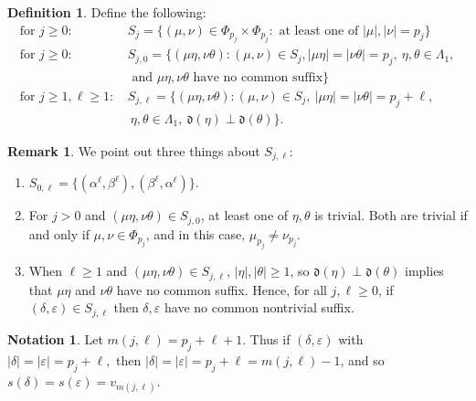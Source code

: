 \documentclass[12pt]{amsart}
\newcommand{\mf}[1]{\mathfrak{#1}}
\newcommand{\al}{\alpha}
\newcommand{\be}{\beta}
\newcommand{\de}{\delta}
\newcommand{\ep}{\varepsilon}
\renewcommand{\th}{\theta}
\newcommand{\La}{\Lambda}
\theoremstyle{plain} %
\theoremstyle{definition} %
\newtheorem{Definition}[Theorem]{Definition}
\newtheorem{Remark}[Theorem]{Remark}
\newtheorem{Notation}[Theorem]{Notation}
\begin{document}
\begin{Definition} Define the following:
\begin{align*}
    \text{for  $j\geq 0$: }& S_j = \{(\mu, \nu) \in \Phi_{p_j} \times \Phi_{p_j} : \text{ at least one of } |\mu|, |\nu| = p_j \}\\
    \text{for  $j\geq 0:$ }& S_{j,0} = \{(\mu\eta, \nu\th) : (\mu, \nu) \in S_j, |\mu\eta| =|\nu\th| = p_j,\ \eta, \th \in \La_1,\\ & \text{ and } \mu\eta, \nu\theta \text{ have no common suffix} \} \\
    \text{for  $j\geq 1,\ell \geq 1$: }& S_{j,\ell} = \{(\mu\eta, \nu\th) : (\mu, \nu) \in S_j,\ |\mu\eta| = |\nu\th| = p_j + \ell,\\
    &\ \eta, \th \in \La_1,\ \mf{d}(\eta)\perp \mf{d}(\th)\}.
\end{align*}
\end{Definition}


\begin{Remark}\label{remark S_jl}
We point out three things about $S_{j,\ell}$: \begin{enumerate}[(1)]
    \item\label{remark S_jl 1} $S_{0, \ell} = \{(\al^{\ell}, \be^{\ell}), (\be^{\ell}, \al^{\ell})\}$.

    \item\label{remark S_jl 2} For $j > 0$ and $(\mu \eta, \nu \th) \in S_{j,0}$, at least one of $\eta, \th$ is trivial. Both are trivial if and only if $\mu, \nu \in \Phi_{p_j}$, and in this case, $\mu_{p_j} \neq \nu_{p_j}$.
    
    \item\label{remark S_jl 3} When $\ell \ge 1$ and $(\mu\eta, \nu\th) \in S_{j,\ell}$, $|\eta|, |\th| \ge 1$, so $\mf{d}(\eta) \perp \mf{d}(\th)$ implies that $\mu\eta$ and $\nu\th$ have no common suffix. Hence, for all $j, \ell \ge 0$, if $(\de, \ep) \in S_{j,\ell}$ then $\de, \ep$ have no common nontrivial suffix.
\end{enumerate}
\end{Remark}

\begin{Notation}
    Let $m(j,\ell) = p_j + \ell + 1$. Thus if $(\delta, \ep) $ with $|\de| = |\ep| = p_j + \ell,$  then $|\delta| = |\ep| = p_j + \ell = m(j,\ell)-1$, and so $s(\delta) = s(\ep) = v_{m(j,\ell)}$.
\end{Notation}
\end{document}

